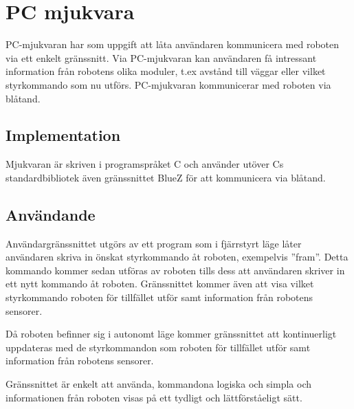 \section{PC mjukvara}
PC-mjukvaran har som uppgift att låta användaren kommunicera med roboten via ett
enkelt gränssnitt. Via PC-mjukvaran kan användaren få intressant information
från robotens olika moduler, t.ex avstånd till väggar eller vilket styrkommando
som nu utförs. PC-mjukvaran kommunicerar med roboten via blåtand.

\subsection{Implementation}

Mjukvaran är skriven i programspråket C och använder utöver Cs standardbibliotek
även gränssnittet BlueZ för att kommunicera via blåtand.

\subsection{Användande}

Användargränssnittet utgörs av ett program som i fjärrstyrt läge låter 
användaren skriva in önskat styrkommando åt roboten, exempelvis ''fram''. Detta
kommando kommer sedan utföras av roboten tills dess att användaren skriver in
ett nytt kommando åt roboten. Gränssnittet kommer även att visa vilket
styrkommando roboten för tillfället utför samt information från robotens
sensorer.

Då roboten befinner sig i autonomt läge kommer gränssnittet att kontinuerligt
uppdateras med de styrkommandon som roboten för tillfället utför samt
information från robotens sensorer. 

Gränssnittet är enkelt att använda, kommandona logiska och simpla och
informationen från roboten visas på ett tydligt och lättförståeligt sätt.

% 
% 
% 
% 
% 
% 
% 
